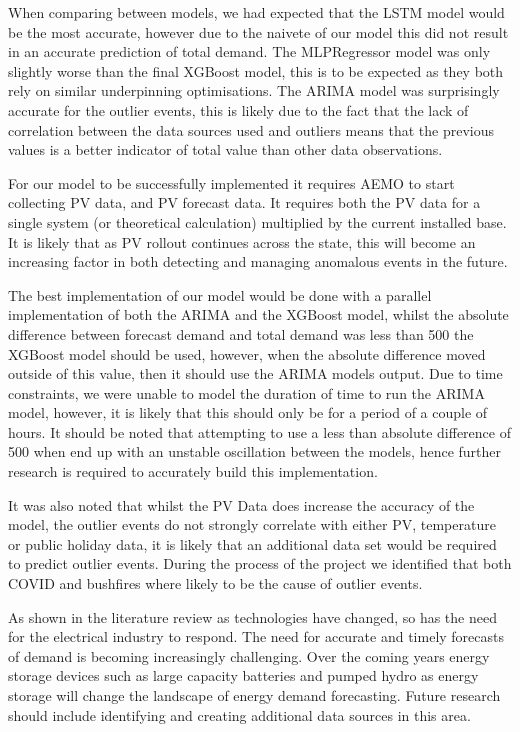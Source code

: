 \documentclass[mstat,12pt]{unswthesis}
\begin{document}
When comparing between models, we had expected that the LSTM model would
be the most accurate, however due to the naivete of our model this did
not result in an accurate prediction of total demand. The MLPRegressor
model was only slightly worse than the final XGBoost model, this is to
be expected as they both rely on similar underpinning optimisations. The
ARIMA model was surprisingly accurate for the outlier events, this is
likely due to the fact that the lack of correlation between the data
sources used and outliers means that the previous values is a better
indicator of total value than other data observations.

For our model to be successfully implemented it requires AEMO to start
collecting PV data, and PV forecast data. It requires both the PV data
for a single system (or theoretical calculation) multiplied by the
current installed base. It is likely that as PV rollout continues across
the state, this will become an increasing factor in both detecting and
managing anomalous events in the future.

The best implementation of our model would be done with a parallel
implementation of both the ARIMA and the XGBoost model, whilst the
absolute difference between forecast demand and total demand was less
than 500 the XGBoost model should be used, however, when the absolute
difference moved outside of this value, then it should use the ARIMA
models output. Due to time constraints, we were unable to model the
duration of time to run the ARIMA model, however, it is likely that this
should only be for a period of a couple of hours. It should be noted
that attempting to use a less than absolute difference of 500 when end
up with an unstable oscillation between the models, hence further
research is required to accurately build this implementation.

It was also noted that whilst the PV Data does increase the accuracy of
the model, the outlier events do not strongly correlate with either PV,
temperature or public holiday data, it is likely that an additional data
set would be required to predict outlier events. During the process of
the project we identified that both COVID and bushfires where likely to
be the cause of outlier events.

As shown in the literature review as technologies have changed, so has
the need for the electrical industry to respond. The need for accurate
and timely forecasts of demand is becoming increasingly challenging.
Over the coming years energy storage devices such as large capacity
batteries and pumped hydro as energy storage will change the landscape
of energy demand forecasting. Future research should include identifying
and creating additional data sources in this area.
\end{document}
